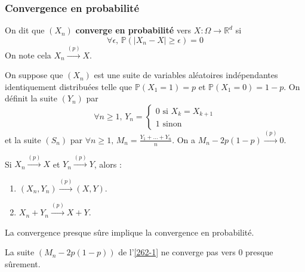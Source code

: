   \subsubsection{Convergence en probabilité}


  \begin{definition}
    On dit que $(X_n)$ \textbf{converge en probabilité} vers $X : \Omega \rightarrow \mathbb{R}^d$ si
    \[ \forall \epsilon, \, \mathbb{P}(\vert X_n - X \vert \geq \epsilon) = 0 \]
    On note cela $X_n \overset{(p)}{\longrightarrow} X$.
  \end{definition}


  \begin{example}
    \label{262-1}
    On suppose que $(X_n)$ est une suite de variables aléatoires indépendantes identiquement distribuées telle que $\mathbb{P}(X_1 = 1) = p$ et $\mathbb{P}(X_1 = 0) = 1-p$. On définit la suite $(Y_n)$ par
    \[
    \forall n \geq 1, \, Y_n = \begin{cases}
      0 \text{ si } X_k = X_{k+1} \\
      1 \text{ sinon}
    \end{cases}
    \]
    et la suite $(S_n)$ par $\forall n \geq 1, \, M_n = \frac{Y_1 + \dots + Y_n}{n}$. On a $M_n - 2p(1-p) \overset{(p)}{\longrightarrow} 0$.
  \end{example}


  \begin{proposition}
    Si $X_n \overset{(p)}{\longrightarrow} X$ et $Y_n \overset{(p)}{\longrightarrow} Y$, alors :
    \begin{enumerate}[label=(\roman*)]
      \item $(X_n, Y_n) \overset{(p)}{\longrightarrow} (X, Y)$.
      \item $X_n + Y_n \overset{(p)}{\longrightarrow} X + Y$.
    \end{enumerate}
  \end{proposition}

  \begin{theorem}
    La convergence presque sûre implique la convergence en probabilité.
  \end{theorem}


  \begin{cexample}
    La suite $(M_n - 2p(1-p))$ de l'\cref{262-1} ne converge pas vers $0$ presque sûrement.
  \end{cexample}

